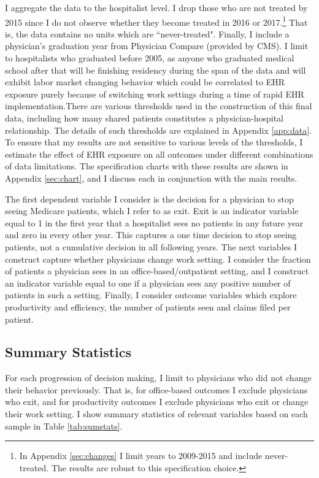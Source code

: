 \documentclass[12pt]{article}
\begin{document}
I aggregate the data to the hospitalist level. I drop those who are not treated by 2015 since I do not observe whether they become treated in 2016 or 2017.\footnote{In Appendix \ref{sec:changes} I limit years to 2009-2015 and include never-treated. The results are robust to this specification choice.} That is, the data contains no units which are ``never-treated". Finally, I include a physician's graduation year from Physician Compare (provided by CMS). I limit to hospitalists who graduated before 2005, as anyone who graduated medical school after that will be finishing residency during the span of the data and will exhibit labor market changing behavior which could be correlated to EHR exposure purely because of switching work settings during a time of rapid EHR implementation.There are various thresholds used in the construction of this final data, including how many shared patients constitutes a physician-hospital relationship. The details of such thresholds are explained in Appendix \ref{app:data}. To ensure that my results  are not sensitive to various levels of the thresholds, I estimate the effect of EHR exposure on all outcomes under different combinations of data limitations. The specification charts with these results are shown in Appendix \ref{sec:chart}, and I discuss each in conjunction with the main results. 

The first dependent variable I consider is the decision for a physician to stop seeing Medicare patients, which I refer to as exit. Exit is an indicator variable equal to 1 in the first year that a hospitalist sees no patients in any future year and zero in every other year. This captures a one time decision to stop seeing patients, not a cumulative decision in all following years. The next variables I construct capture whether physicians change work setting. I consider the fraction of patients a physician sees in an office-based/outpatient setting, and I construct an indicator variable equal to one if a physician sees any positive number of patients in such a setting. Finally, I consider outcome variables which explore productivity and efficiency, the number of patients seen and claims filed per patient.


\subsection{Summary Statistics}

For each progression of decision making, I limit to physicians who did not change their behavior previously. That is, for office-based outcomes I exclude physicians who exit, and for productivity outcomes I exclude physicians who exit or change their work setting. I show summary statistics of relevant variables based on each sample in Table \ref{tab:sumstats}. 
\end{document}
